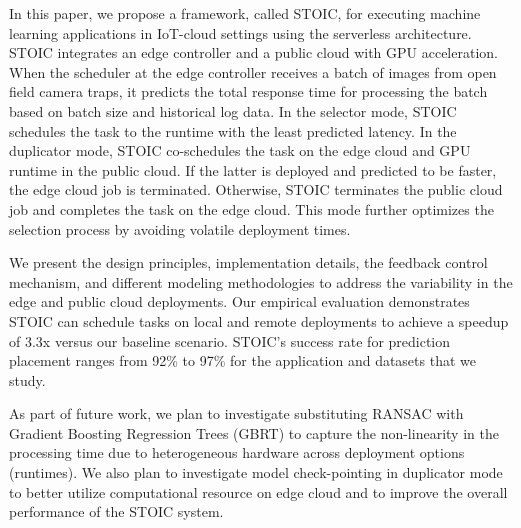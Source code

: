 In this paper, we propose a framework, called STOIC, for executing machine learning applications in IoT-cloud settings using the serverless architecture. STO\-IC integrates an edge controller and a public cloud with GPU acceleration. When the scheduler at the edge controller receives a batch of images from open field camera traps, it predicts the total response time for processing the batch based on batch size and historical log data. In the selector mode, STOIC schedules the task to the runtime with the least predicted latency. In the duplicator mode, STOIC co-schedules the task on the edge cloud and GPU runtime in the public cloud. If the latter is deployed and predicted to be faster, the edge cloud job is terminated. Otherwise, STOIC terminates the public cloud job and completes the task on the edge cloud. This mode further optimizes the selection process by avoiding volatile deployment times.

We present the design principles, implementation details, the feedback control mechanism, and different modeling methodologies to address the variability in the edge and public cloud deployments. Our empirical evaluation demonstrates STOIC can schedule tasks on local and remote deployments to achieve a speedup of 3.3x versus our baseline scenario. STOIC's success rate for prediction placement  ranges from 92\% to 97\% for the application and datasets that we study. 

As part of future work, we plan to investigate substituting RANSAC with Gradient Boosting Regression Trees (GBRT) to capture the non-linearity in the processing time due to heterogeneous hardware across deployment options (runtimes). We also plan to investigate model check-pointing in duplicator mode to better utilize computational resource on edge cloud and to improve the overall performance of the STOIC system.
